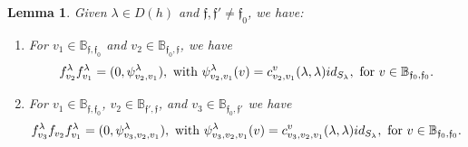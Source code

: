 \documentclass{article}
\newtheorem{lemma}[theorem]{Lemma}
\theoremstyle{definition}
\renewcommand{\frak}{\mathfrak}
\newcommand{\hueca}[1]{\mathbb{#1}}
\begin{document}
\begin{lemma}\label{L: de las lambda-compos}
Given $\lambda\in D(h)$ and $\frak{f},\frak{f}'\not=\frak{f}_0$,  we have:
\begin{enumerate}
\item For $v_1\in \hueca{B}_{\frak{f},\frak{f}_0}$ and $v_2\in \hueca{B}_{\frak{f}_0,\frak{f}}$, we have 
$$f_{v_2}^\lambda f_{v_1}^\lambda=(0,\psi_{v_2,v_1}^\lambda), \hbox{ with } \psi_{v_2,v_1}^\lambda(v)=c^v_{v_2,v_1}(\lambda,\lambda)id_{S_\lambda}, \hbox{ for }v\in \hueca{B}_{\frak{f}_0,\frak{f}_0}.$$
\item For $v_1\in \hueca{B}_{\frak{f},\frak{f}_0}$, 
 $v_2\in \hueca{B}_{\frak{f}',\frak{f}}$, and $v_3\in \hueca{B}_{\frak{f}_0,\frak{f}'}$ we have 
$$f^\lambda_{v_3} f_{v_2} f_{v_1}^\lambda=(0,\psi_{v_3,v_2,v_1}^\lambda), \hbox{ with } \psi_{v_3,v_2,v_1}^\lambda(v)=c^v_{v_3,v_2,v_1}(\lambda,\lambda)id_{S_\lambda}, \hbox{ for }v\in \hueca{B}_{\frak{f}_0,\frak{f}_0}.$$
\end{enumerate}
\end{lemma}
\end{document}
